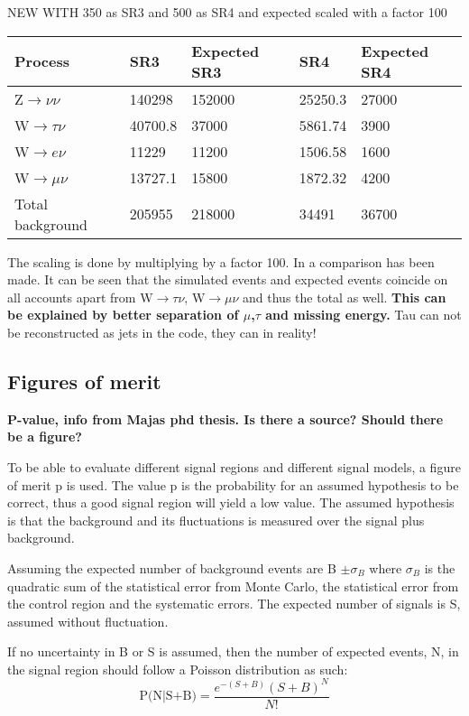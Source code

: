 NEW WITH 350 as SR3 and 500 as SR4 and expected scaled with a factor 100

\begin{center}
\begin{tabular}{|l|l|l|l|l|}
\hline
Process & SR3 & Expected SR3 & SR4  & Expected SR4 \\ \hline
Z$\rightarrow\nu\nu$&140298&152000&25250.3&27000 \\
W$\rightarrow\tau\nu$&40700.8&37000&5861.74&3900 \\
W$\rightarrow e\nu$&11229&11200&1506.58&1600 \\
W$\rightarrow\mu\nu$&13727.1&15800&1872.32&4200 \\ \hline
Total background&205955&218000&34491&36700 \\ \hline
\end{tabular}
\end{center}


The scaling is done by multiplying by a factor 100.
In  a comparison has been made. It can be seen that the simulated events and expected events coincide on all accounts apart from W$\rightarrow\tau\nu$, W$\rightarrow\mu\nu$ and thus the total as well. \textbf{This can be explained by better separation of $\mu$,$\tau$ and missing energy.} 
Tau can not be reconstructed as jets in the code, they can in reality!

\subsection{Figures of merit}
\textbf{P-value, info from Majas phd thesis. Is there a source? Should there be a figure?}

To be able to evaluate different signal regions and different signal models, a figure of merit p is used. The value p is the probability for an assumed hypothesis to be correct, thus a good signal region will yield a low value. The assumed hypothesis is that the background and its fluctuations is measured over the signal plus background.

Assuming the expected number of background events are B $\pm \sigma_B$ where $\sigma_B$ is the quadratic sum of the statistical error from Monte Carlo, the statistical error from the control region and the systematic errors. The expected number of signals is S, assumed without fluctuation. 

If no uncertainty in B or S is assumed, then the number of expected events, N, in the signal region should follow a Poisson distribution as such:
\begin{equation}
\text{P(N|S+B)}=\frac{e^{-(S+B)}(S+B)^N}{N!}
\end{equation} 

